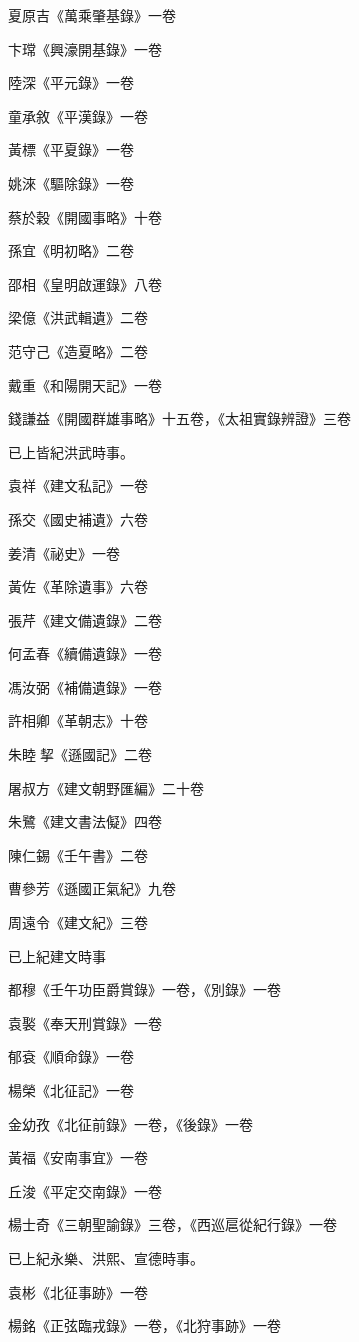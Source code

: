 夏原吉《萬乘肇基錄》一卷

卞瑺《興濠開基錄》一卷

陸深《平元錄》一卷

童承敘《平漢錄》一卷

黃標《平夏錄》一卷

姚淶《驅除錄》一卷

蔡於穀《開國事略》十卷

孫宜《明初略》二卷

邵相《皇明啟運錄》八卷

梁億《洪武輯遺》二卷

范守己《造夏略》二卷

戴重《和陽開天記》一卷

錢謙益《開國群雄事略》十五卷，《太祖實錄辨證》三卷

已上皆紀洪武時事。

袁祥《建文私記》一卷

孫交《國史補遺》六卷

姜清《祕史》一卷

黃佐《革除遺事》六卷

張芹《建文備遺錄》二卷

何孟春《續備遺錄》一卷

馮汝弼《補備遺錄》一卷

許相卿《革朝志》十卷

朱睦挈《遜國記》二卷

屠叔方《建文朝野匯編》二十卷

朱鷺《建文書法儗》四卷

陳仁錫《壬午書》二卷

曹參芳《遜國正氣紀》九卷

周遠令《建文紀》三卷

已上紀建文時事

都穆《壬午功臣爵賞錄》一卷，《別錄》一卷

袁褧《奉天刑賞錄》一卷

郁袞《順命錄》一卷

楊榮《北征記》一卷

金幼孜《北征前錄》一卷，《後錄》一卷

黃福《安南事宜》一卷

丘浚《平定交南錄》一卷

楊士奇《三朝聖諭錄》三卷，《西巡扈從紀行錄》一卷

已上紀永樂、洪熙、宣德時事。

袁彬《北征事跡》一卷

楊銘《正弦臨戎錄》一卷，《北狩事跡》一卷

